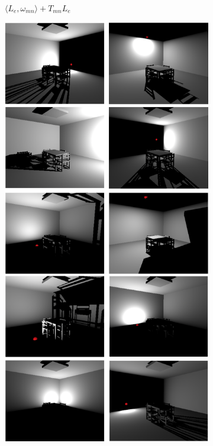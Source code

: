 \begin{figure}
\begin{fullwidth}
\begin{subfigure}[b]{0.38\thewidth}
		\caption{$\langle L_e,\omega_{mn} \rangle+T_{mn}L_e$}
	\end{subfigure}
	\begin{subfigure}[b]{0.37\thewidth}
		\includegraphics[width=1.0\textwidth]{figures/ir/ir-1-2}

\end{subfigure}
\end{fullwidth}
\end{figure}
